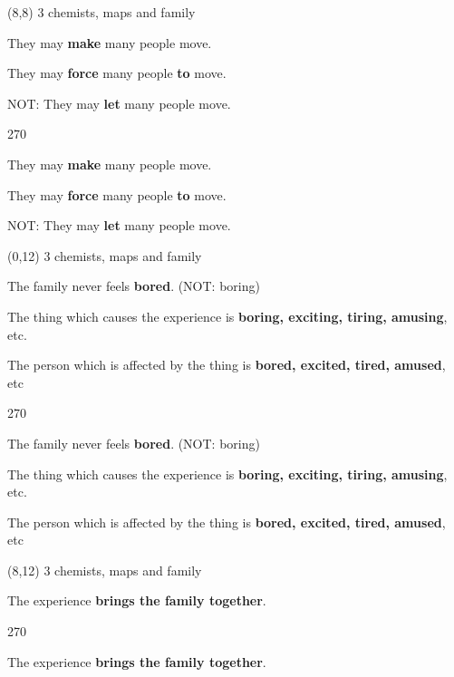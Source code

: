 \documentclass[a4paper]{article}
\newenvironment{itemize*}%
{\begin{itemize}%
 \setlength{\itemsep}{0.0cm}%
 \setlength{\parsep}{0pt}%
 \setlength{\parskip}{0pt}}%
{\end{itemize}}
\newcommand{\mycard}[3]{%
	\small #1 #2
	\par
	\parbox[t][6.8cm][c]{9.5cm}{%
	\par
	\myleft{#3}
	\par
	\myright{#3}
	}
}
\newcommand{\myleft}[1]{%
	\begin{sideways}
	\hspace*{-0.9cm}
		\parbox[t][2.7cm][t]{6.5cm}{%
		\Large #1
		}
	\end{sideways}
}
\newcommand{\myright}[1]{%
	\hspace*{6.5cm}
	\begin{turn}{270}
	\hspace*{-7.1cm}
		\parbox[t][2.7cm][t]{6.5cm}{%
		\Large #1
		}
	\end{turn}
}
\begin{document}
\begin{textblock}{8}(8,8)
\mycard{3}{chemists, maps and family}{
\begin{itemize*}
\item They may \textbf{make} many people move.
\item They may \textbf{force} many people \textbf{to} move.
\item NOT: They may \textbf{let} many people move.
\end{itemize*}
}
\end{textblock}

\begin{textblock}{8}(0,12)
\mycard{3}{chemists, maps and family}{
\begin{itemize*}
\item The family never feels \textbf{bored}. (NOT: boring)
\item The thing which causes the experience is \textbf{boring, exciting, tiring, amusing}, etc.
\item The person which is affected by the thing is \textbf{bored, excited, tired, amused}, etc
\end{itemize*}
}
\end{textblock}

\begin{textblock}{8}(8,12)
\mycard{3}{chemists, maps and family}{
\begin{itemize*}
\item The experience \textbf{brings the family together}.
\end{itemize*}
}
\end{textblock}

\null
\newpage
\end{document}
